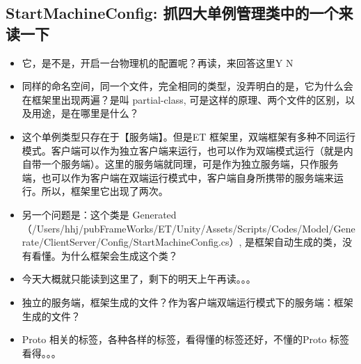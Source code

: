\documentclass[9pt, b5paper]{article}
\begin{document}
\subsection{StartMachineConfig: 抓四大单例管理类中的一个来读一下}
\label{sec-6-7}
\begin{itemize}
\item 它，是不是，开启一台物理机的配置呢？再读，来回答这里Y N
\item 同样的命名空间，同一个文件，完全相同的类型，没弄明白的是，它为什么会在框架里出现两遍？是叫 partial-class, 可是这样的原理、两个文件的区别，以及用途，是在哪里是什么？
\item 这个单例类型只存在于【服务端】。但是ET 框架里，双端框架有多种不同运行模式。客户端可以作为独立客户端来运行，也可以作为双端模式运行（就是内自带一个服务端）。这里的服务端就同理，可是作为独立服务端，只作服务端，也可以作为客户端在双端运行模式中，客户端自身所携带的服务端来运行。所以，框架里它出现了两次。
\item 另一个问题是：这个类是 Generated （/Users/hhj/pubFrameWorks/ET/Unity/Assets/Scripts/Codes/Model/Generate/ClientServer/Config/StartMachineConfig.cs）, 是框架自动生成的类，没有看懂。为什么框架会生成这个类？
\item 今天大概就只能读到这里了，剩下的明天上午再读。。。
\item 独立的服务端，框架生成的文件？作为客户端双端运行模式下的服务端：框架生成的文件？
\item Proto 相关的标签，各种各样的标签，看得懂的标签还好，不懂的Proto 标签看得。。。
\end{itemize}
\end{document}

